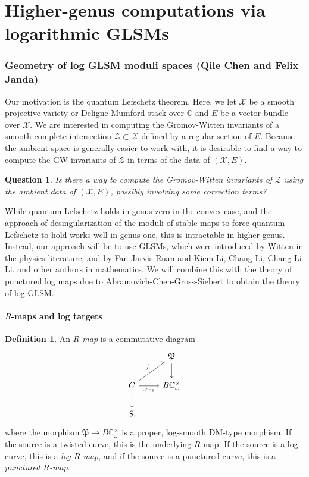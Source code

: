 \documentclass[10pt]{amsart}
\newtheorem{quest}[thm]{Question}
\theoremstyle{definition}
\newtheorem{defn}[thm]{Definition}
\theoremstyle{remark}
\theoremstyle{plain}
\theoremstyle{definition}
\theoremstyle{remark}
\newcommand{\C}{\mathbb{C}}
\newcommand{\mc}[1]{\mathcal{#1}}
\newcommand{\mf}[1]{\mathfrak{#1}}
\newcommand{\1}{\mathbf{1}}
\newcommand{\2}{\mathbf{2}}
\newcommand{\3}{\mathbf{3}}
\begin{document}
\part{Higher-genus computations via logarithmic GLSMs}
\label{pt:logglsm}

\section{Geometry of log GLSM moduli spaces (Qile Chen and Felix Janda)}%
\label{sec:Foundationslogglsm}

Our motivation is the quantum Lefschetz theorem. Here, we let $\mc{X}$ be a smooth projective variety or Deligne-Mumford stack over $\C$ and $E$ be a vector bundle over $\mc{X}$. We are interested in computing the Gromov-Witten invariants of a smooth complete intersection $\mc{Z} \subset \mc{X}$ defined by a regular section of $E$. Because the ambient space is generally easier to work with, it is desirable to find a way to compute the GW invariants of $\mc{Z}$ in terms of the data of $(\mc{X}, E)$.

\begin{quest}
    Is there a way to compute the Gromov-Witten invariants of $\mc{Z}$ using the ambient data of $(\mc{X}, E)$, possibly involving some correction terms?
\end{quest}

While quantum Lefschetz holds in genus zero in the convex case, and the approach of desingularization of the moduli of stable maps to force quantum Lefschetz to hold works well in genus one, this is intractable in higher-genus. Instead, our approach will be to use GLSMs, which were introduced by Witten in the physics literature, and by Fan-Jarvis-Ruan and Kiem-Li, Chang-Li, Chang-Li-Li, and other authors in mathematics. We will combine this with the theory of punctured log maps due to Abramovich-Chen-Gross-Siebert to obtain the theory of log GLSM.

\subsection{$R$-maps and log targets}%
\label{sub:R-maps}

\begin{defn}
    An \textit{$R$-map} is a commutative diagram
    \begin{equation*}
    \begin{tikzcd}
        & \mf{P} \ar{d} \\
        C \ar{d} \ar{ur}{f} \ar[swap]{r}{\omega_{\log}} & B \C^{\times}_{\omega} \\
        S,
    \end{tikzcd}
    \end{equation*}
    where the morphism $\mf{P} \to B\C_{\omega}^{\times}$ is a proper, log-smooth DM-type morphism. If the source is a twisted curve, this is the underlying $R$-map. If the source is a log curve, this is a \textit{log $R$-map}, and if the source is a punctured curve, this is a \textit{punctured $R$-map}.
\end{defn}
\end{document}
